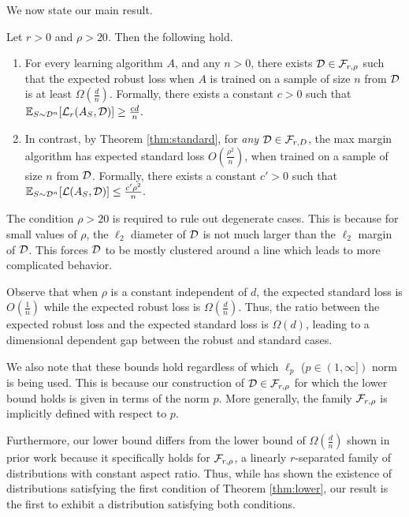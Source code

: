 We now state our main result.
\begin{thm}\label{thm:lower}
Let $r > 0$ and $\rho > 20$. Then the following hold.
\begin{enumerate}
	\item For every learning algorithm $A$, and any $n > 0$, there exists ${\mathcal D} \in {\mathcal F}_{r, \rho}$ such that the expected robust loss when $A$ is trained on a sample of size $n$ from ${\mathcal D}$ is at least $\Omega(\frac{d}{n})$. Formally, there exists a constant $c > 0$ such that ${\mathbb E}_{S \sim {\mathcal D}^n}[\mathcal L_r(A_S, {\mathcal D})] \geq \frac{cd}{n}.$
	\item  In contrast, by Theorem \ref{thm:standard}, for \textit{any} ${\mathcal D} \in {\mathcal F}_{r, D}$, the max margin algorithm has expected standard loss $O(\frac{\rho^2}{n})$, when trained on a sample of size $n$ from ${\mathcal D}$. Formally, there exists a constant $c' > 0$ such that ${\mathbb E}_{S \sim {\mathcal D}^n}[\mathcal L(A_S, {\mathcal D})] \leq \frac{c'\rho^2}{n}.$
\end{enumerate}
\end{thm}
The condition $\rho > 20$ is required to rule out degenerate cases. This is because for small values of $\rho$, the $\ell_2$ diameter of ${\mathcal D}$ is not much larger than the $\ell_2$ margin of ${\mathcal D}$. This forces ${\mathcal D}$ to be mostly clustered around a line which leads to more complicated behavior.

Observe that when $\rho$ is a constant independent of $d$, the expected  standard loss is $O(\frac{1}{n})$ while the expected robust loss is $\Omega(\frac{d}{n})$. Thus, the ratio between the expected robust loss and the expected standard loss is $\Omega(d)$, leading to a dimensional dependent gap between the robust and standard cases. 

We also note that these bounds hold regardless of which $\ell_p$ ($p \in (1, \infty])$ norm is being used. This is because our construction of ${\mathcal D} \in {\mathcal F}_{r, \rho}$ for which the lower bound holds is given in terms of the norm $p$. More generally, the family ${\mathcal F}_{r, \rho}$ is implicitly defined with respect to $p$.

Furthermore, our lower bound differs from the lower bound of $\Omega(\frac{d}{n})$ shown in prior work \cite{Cullina18} because it specifically holds for ${\mathcal F}_{r, \rho}$, a linearly $r$-separated family of distributions with constant aspect ratio. Thus, while \cite{Cullina18} has shown the existence of distributions satisfying the first condition of Theorem \ref{thm:lower}, our result is the first to exhibit a distribution satisfying both conditions.


